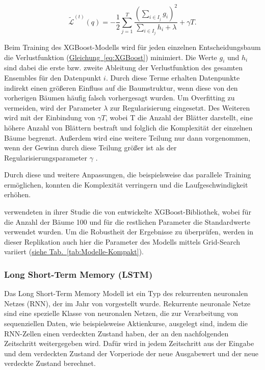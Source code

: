 \documentclass[a4paper, 12pt]{article}
\begin{document}
\begin{equation}
	\tilde{\mathcal{L}}^{(t)}(q) = -\frac{1}{2} \sum_{j=1}^{T} \frac{\left(\sum_{i \in I_j} g_i\right)^2}{\sum_{i \in I_j} h_i + \lambda} + \gamma T.
	\label{eq:XGBoost}
\end{equation}

Beim Training des XGBoost-Modells wird für jeden einzelnen Entscheidungsbaum die Verlustfunktion (\hyperref[eq:XGBoost]{Gleichung~\ref*{eq:XGBoost}}) minimiert.
Die Werte $g_i$ und $h_i$ sind dabei die erste bzw. zweite Ableitung der Verlustfunktion des gesamten Ensembles für den Datenpunkt $i$.
Durch diese Terme erhalten Datenpunkte indirekt einen größeren Einfluss auf die Baumstruktur, wenn diese von den vorherigen Bäumen häufig falsch vorhergesagt wurden.
Um Overfitting zu vermeiden, wird der Parameter $\lambda$ zur Regularisierung eingesetzt.
Des Weiteren wird mit der Einbindung von $\gamma T$, wobei T die Anzahl der Blätter darstellt, eine höhere Anzahl von Blättern bestraft und folglich die Komplexität der einzelnen Bäume begrenzt.
Außerdem wird eine weitere Teilung nur dann vorgenommen, wenn der Gewinn durch diese Teilung größer ist als der Regularisierungsparameter $\gamma$ \parencite{Chen2016}.

Durch diese und weitere Anpassungen, die beispielsweise das parallele Training ermöglichen, konnten \citeauthor{Chen2016} die Komplexität verringern und die Laufgeschwindigkeit erhöhen.

\textcite{Goutte2023} verwendeten in ihrer Studie die von \citeauthor{Chen2016} entwickelte XGBoost-Bibliothek, wobei für die Anzahl der Bäume 100 und für die restlichen Parameter die Standardwerte verwendet wurden.
Um die Robustheit der Ergebnisse zu überprüfen, werden in dieser Replikation auch hier die Parameter des Modells mittels Grid-Search variiert (\hyperref[tab:Modelle-Kompakt]{siehe Tab.~\ref*{tab:Modelle-Kompakt}}).


\subsubsection{Long Short-Term Memory (LSTM)}
Das Long Short-Term Memory Modell ist ein Typ des rekurrenten neuronalen Netzes (RNN), der im Jahr \citeyear{Hochreiter1997} von \citeauthor{Hochreiter1997} vorgestellt wurde.
Rekurrente neuronale Netze sind eine spezielle Klasse von neuronalen Netzen, die zur Verarbeitung von sequenziellen Daten, wie beispielsweise Aktienkurse, ausgelegt sind, indem die RNN-Zellen einen verdeckten Zustand haben, der an den nachfolgenden Zeitschritt weitergegeben wird.
Dafür wird in jedem Zeitschritt aus der Eingabe und dem verdeckten Zustand der Vorperiode der neue Ausgabewert und der neue verdeckte Zustand berechnet.
\end{document}
